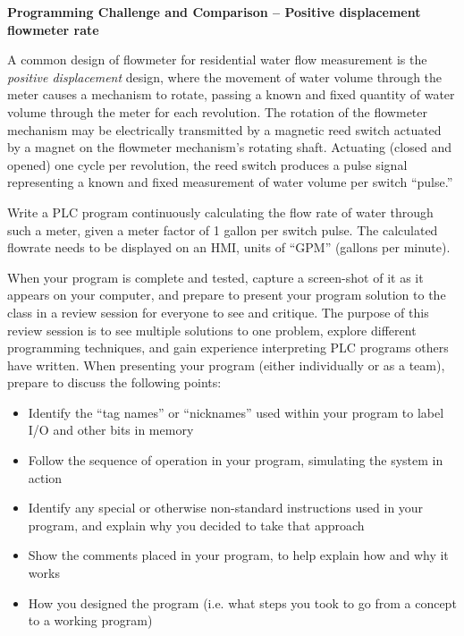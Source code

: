 

\noindent
{\bf Programming Challenge and Comparison -- Positive displacement flowmeter rate} 

\vskip 10pt

A common design of flowmeter for residential water flow measurement is the {\it positive displacement} design, where the movement of water volume through the meter causes a mechanism to rotate, passing a known and fixed quantity of water volume through the meter for each revolution.  The rotation of the flowmeter mechanism may be electrically transmitted by a magnetic reed switch actuated by a magnet on the flowmeter mechanism's rotating shaft.  Actuating (closed and opened) one cycle per revolution, the reed switch produces a pulse signal representing a known and fixed measurement of water volume per switch ``pulse.''

\vskip 10pt

Write a PLC program continuously calculating the flow rate of water through such a meter, given a meter factor of 1 gallon per switch pulse.  The calculated flowrate needs to be displayed on an HMI, units of ``GPM'' (gallons per minute). 

\vskip 10pt

When your program is complete and tested, capture a screen-shot of it as it appears on your computer, and prepare to present your program solution to the class in a review session for everyone to see and critique.  The purpose of this review session is to see multiple solutions to one problem, explore different programming techniques, and gain experience interpreting PLC programs others have written.  When presenting your program (either individually or as a team), prepare to discuss the following points:

\begin{itemize}
\item{} Identify the ``tag names'' or ``nicknames'' used within your program to label I/O and other bits in memory
\item{} Follow the sequence of operation in your program, simulating the system in action
\item{} Identify any special or otherwise non-standard instructions used in your program, and explain why you decided to take that approach
\item{} Show the comments placed in your program, to help explain how and why it works
\item{} How you designed the program (i.e. what steps you took to go from a concept to a working program)
\end{itemize}

